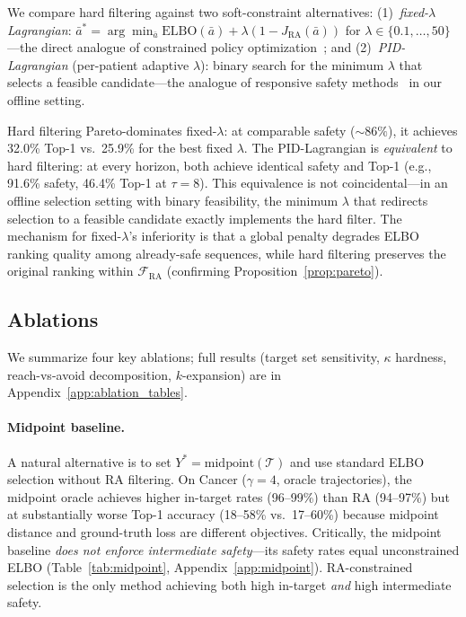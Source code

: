 \documentclass{article}
\newcommand{\ba}{\bar{a}}
\newcommand{\cT}{\mathcal{T}}
\newcommand{\cF}{\mathcal{F}}
\begin{document}
We compare hard filtering against two soft-constraint alternatives: (1)~\emph{fixed-$\lambda$ Lagrangian}: $\ba^* = \arg\min_{\ba} \mathrm{ELBO}(\ba) + \lambda(1 - J_{\mathrm{RA}}(\ba))$ for $\lambda \in \{0.1, \ldots, 50\}$---the direct analogue of constrained policy optimization~\citep{achiam2017constrained, tessler2019rcpo}; and (2)~\emph{PID-Lagrangian} (per-patient adaptive $\lambda$): binary search for the minimum $\lambda$ that selects a feasible candidate---the analogue of responsive safety methods~\citep{stooke2020responsive} in our offline setting.

Hard filtering Pareto-dominates fixed-$\lambda$: at comparable safety (${\sim}86\%$), it achieves 32.0\% Top-1 vs.\ 25.9\% for the best fixed $\lambda$. The PID-Lagrangian is \emph{equivalent} to hard filtering: at every horizon, both achieve identical safety and Top-1 (e.g., 91.6\% safety, 46.4\% Top-1 at $\tau = 8$). This equivalence is not coincidental---in an offline selection setting with binary feasibility, the minimum $\lambda$ that redirects selection to a feasible candidate exactly implements the hard filter. The mechanism for fixed-$\lambda$'s inferiority is that a global penalty degrades ELBO ranking quality among already-safe sequences, while hard filtering preserves the original ranking within $\cF_{\mathrm{RA}}$ (confirming Proposition~\ref{prop:pareto}).


\subsection{Ablations}
\label{sec:ablations}

We summarize four key ablations; full results (target set sensitivity, $\kappa$ hardness, reach-vs-avoid decomposition, $k$-expansion) are in Appendix~\ref{app:ablation_tables}.

\vspace{-0.8em}
\paragraph{Midpoint baseline.} A natural alternative is to set $Y^* = \mathrm{midpoint}(\cT)$ and use standard ELBO selection without RA filtering. On Cancer ($\gamma = 4$, oracle trajectories), the midpoint oracle achieves higher in-target rates (96--99\%) than RA (94--97\%) but at substantially worse Top-1 accuracy (18--58\% vs.\ 17--60\%) because midpoint distance and ground-truth loss are different objectives. Critically, the midpoint baseline \emph{does not enforce intermediate safety}---its safety rates equal unconstrained ELBO (Table~\ref{tab:midpoint}, Appendix~\ref{app:midpoint}). RA-constrained selection is the only method achieving both high in-target \emph{and} high intermediate safety.
\end{document}
